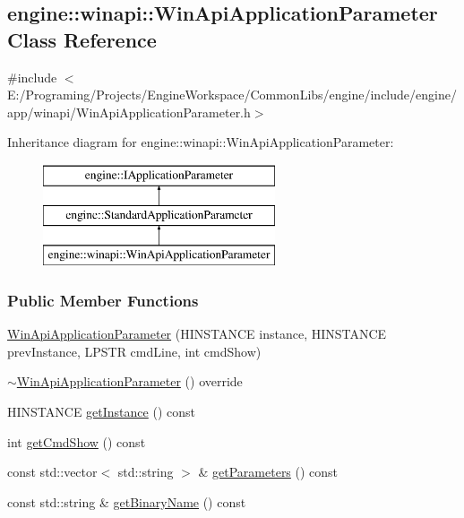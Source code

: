 \hypertarget{a00081}{}\subsection{engine\+:\+:winapi\+:\+:Win\+Api\+Application\+Parameter Class Reference}
\label{a00081}


{\ttfamily \#include $<$E\+:/\+Programing/\+Projects/\+Engine\+Workspace/\+Common\+Libs/engine/include/engine/app/winapi/\+Win\+Api\+Application\+Parameter.\+h$>$}

Inheritance diagram for engine\+:\+:winapi\+:\+:Win\+Api\+Application\+Parameter\+:\begin{figure}[H]
\begin{center}
\leavevmode
\includegraphics[height=3.000000cm]{a00081}
\end{center}
\end{figure}
\subsubsection*{Public Member Functions}
\begin{DoxyCompactItemize}
\item 
\hyperlink{a00081_af7fef7fdba7239b1b01e9ba9c46c1a32}{Win\+Api\+Application\+Parameter} (H\+I\+N\+S\+T\+A\+N\+CE instance, H\+I\+N\+S\+T\+A\+N\+CE prev\+Instance, L\+P\+S\+TR cmd\+Line, int cmd\+Show)
\item 
\hyperlink{a00081_a8cf7f2740093b195aa980b9791b2b4cb}{$\sim$\+Win\+Api\+Application\+Parameter} () override
\item 
H\+I\+N\+S\+T\+A\+N\+CE \hyperlink{a00081_a35f806d57b22fa9bcab1b6391a8060b7}{get\+Instance} () const 
\item 
int \hyperlink{a00081_a30232e7cd9fce28ce65b7b3b7325f69f}{get\+Cmd\+Show} () const 
\item 
const std\+::vector$<$ std\+::string $>$ \& \hyperlink{a00071_ae482854d2439758cfd1d2c710c621b4f}{get\+Parameters} () const 
\item 
const std\+::string \& \hyperlink{a00071_a5d29ea3dfb725dc1a386926896b5a48a}{get\+Binary\+Name} () const 
\end{DoxyCompactItemize}
